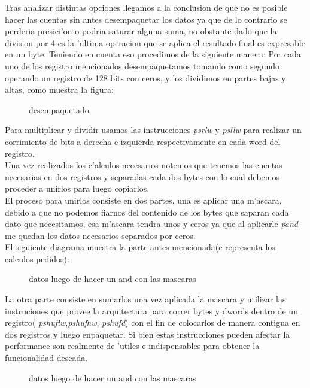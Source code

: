 Tras analizar distintas opciones llegamos a la conclusion de
que no es posible  hacer las cuentas sin antes desempaquetar los datos ya que de lo contrario se perderia
presici'on o  podria saturar alguna suma, no obstante dado que la division por 4 es la 'ultima operacion que 
se aplica el resultado final es expresable en un byte. Teniendo en cuenta eso procedimos de la siguiente 
manera: 
Por cada uno de los registro mencionados desempaquetamos tomando como segundo operando un registro de 128
bits con ceros, y los dividimos en partes bajas y altas, como muestra la figura: \\
\begin{figure}[hb]
\caption{desempaquetado}
\label{est:m-uno}
\end{figure}
Para multiplicar y dividir usamos las instrucciones \textit{psrlw} y \textit{psllw} para realizar un corrimiento 
de bits a derecha e izquierda respectivamente en cada word del registro. \\
Una vez realizados los c'alculos necesarios notemos que tenemos las cuentas necesarias en dos registros
y separadas cada dos bytes con lo cual debemos proceder a unirlos para luego copiarlos. \\
El proceso para unirlos consiste en dos partes, una es aplicar una m'ascara, debido a que no podemos 
fiarnos del contenido de los bytes que saparan cada dato que necesitamos, esa m'ascara tendra unos 
y ceros ya que al aplicarle \textit{pand} me quedan los datos necesarios separados por ceros.\\
El siguiente diagrama muestra la parte antes mencionada(c representa los calculos pedidos):
\begin{figure}[hb]
\caption{datos luego de hacer un and con las mascaras}
\label{est:m-uno}
\end{figure}
La otra parte consiste en sumarlos una vez aplicada la mascara y utilizar las instruciones que provee
la arquitectura para correr bytes y dwords dentro de un registro( \textit{pshuflw},\textit{pshufhw},
\textit{pshufd}) con el fin de colocarlos de manera contigua en dos registros y luego enpaquetar. Si bien 
estas instrucciones pueden afectar la performance son realmente de 'utiles e
indispensables para obtener la funcionalidad deseada.
\begin{figure}[hb]
\caption{datos luego de hacer un and con las mascaras}
\label{est:m-uno}
\end{figure}

